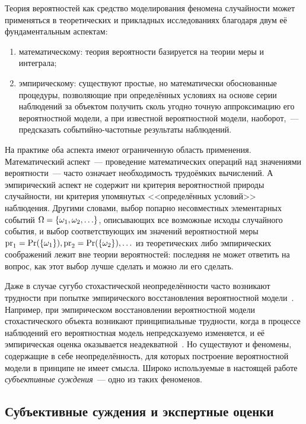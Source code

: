 Теория вероятностей как средство моделирования феномена случайности может применяться в теоретических и прикладных исследованиях благодаря двум её фундаментальным аспектам:
\begin{enumerate}
  \item математическому: теория вероятности базируется на теории меры и интеграла;
  \item эмпирическому: существуют простые, но математически обоснованные процедуры, позволяющие при определённых условиях
на основе серии наблюдений за объектом получить сколь угодно точную аппроксимацию его вероятностной модели, а при известной вероятностной модели, наоборот,~--- предсказать событийно-частотные результаты наблюдений. 
\end{enumerate}

На практике оба аспекта имеют ограниченную область применения. Математический аспект~--- проведение математических операций над значениями вероятности~--- часто означает необходимость трудоёмких вычислений. А эмпирический аспект не содержит ни критерия вероятностной природы случайности, ни критерия упомянутых <<определённых условий>> наблюдения. Другими словами, выбор попарно несовместных элементарных событий $\Omega = \{\omega_1, \omega_2, \ldots\}$, описывающих все возможные исходы случайного события, и выбор соответствующих им значений вероятностной меры ${\mathrm{pr}}_1 = {\mathrm{Pr}}(\{\omega_1\}), {\mathrm{pr}}_2 = {\mathrm{Pr}}(\{\omega_2\}), \ldots$ из теоретических либо эмпирических соображений лежит вне теории вероятностей: последняя не может ответить на вопрос, как этот выбор лучше сделать и можно ли его сделать.

Даже в случае сугубо стохастической неопределённости часто возникают трудности при попытке эмпирического восстановления вероятностной модели~\cite{pytstrange}. Например, при эмпирическом восстановлении вероятностной модели стохастического объекта возникают принципиальные трудности, когда в процессе наблюдений его вероятностная модель непредсказуемо изменяется, и её эмпирическая оценка оказывается неадекватной~\cite{pyt2013}. Но существуют и феномены, содержащие в себе неопределённость, для которых построение вероятностной модели в принципе не имеет смысла. Широко используемые в настоящей работе {\sl субъективные суждения}~--- одно из таких феноменов. 

\subsection{Субъективные суждения и экспертные оценки}
\label{sec:intro_subjective}

